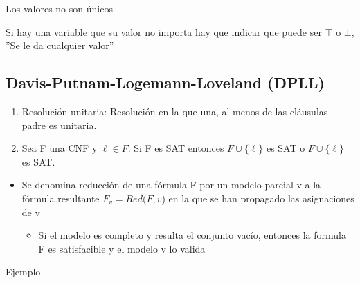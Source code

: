 \documentclass[12pt, twoside, openright]{report} %
\begin{document}
Los valores no son únicos

Si hay una variable que su valor no importa hay que indicar que puede ser $\top$ o $\bot$, ''Se le da cualquier valor''

	
\subsection{Davis-Putnam-Logemann-Loveland (DPLL)}

  \begin{enumerate}
  \def\labelenumi{\arabic{enumi}.}

  \item
    Resolución unitaria: Resolución en la que una, al menos de las
    cláusulas padre es unitaria.
  \item
    Sea F una CNF y \(\ell \in F\). Si F es SAT entonces
    \(F \cup \{ \ell \}\) es SAT o \(F \cup \{ \overline{\ell} \}\) es
    SAT.
  \end{enumerate}

  \begin{itemize}
  \item
    Se denomina reducción de una fórmula F por un modelo parcial v a la
    fórmula resultante \(F_v = Red(F, v\)) en la que se han propagado
    las asignaciones de v

    \begin{itemize}
  
    \item
      Si el modelo es completo y resulta el conjunto vacío, entonces la
      formula F es satisfacible y el modelo v lo valida
    \end{itemize}
  \end{itemize}

  Ejemplo
\end{document}
